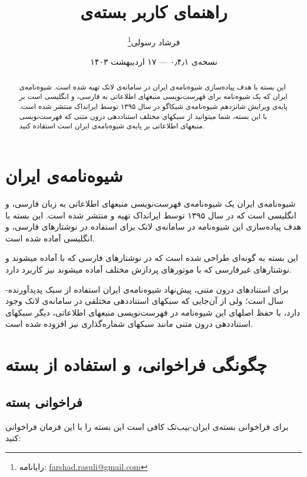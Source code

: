 \documentclass[a4paper,11pt]{article}
\begin{document}
\title{راهنمای کاربر بسته‌ی }
\author{فرشاد رسولی\thanks{رایانامه: \url{farshad.rasuli@gmail.com}}}
\date{نسخه‌ی ۰٫۴٫۱ --- ۱۷ اردیبهشت ۱۴۰۳}
\maketitle


\begin{abstract}
این بسته با هدف پیاده‌سازی شیوه‌نامه‌ی ایران در سامانه‌ی لاتک تهیه شده است. شیوه‌نامه‌ی ایران که یک شیوه‌نامه برای فهرست‌نویسی منبعهای اطلاعاتی به فارسی، و انگلیسی است بر پایه‌ی ویرایش شانزدهم شیوه‌نامه‌ی شیکاگو در سال ۱۳۹۵ توسط ایرانداک منتشر شده است. با این بسته، شما میتوانید از سبکهای مختلف استناددهی درون متنی که فهرست‌نویسی منبعهای اطلاعاتی بر پایه‌ی شیوه‌نامه‌ی ایران است استفاده کنید.
\end{abstract}



\section{شیوه‌نامه‌ی ایران}
شیوه‌نامه‌ی ایران یک شیوه‌نامه‌ی فهرست‌نویسی منبعهای اطلاعاتی به زبان فارسی، و انگلیسی است که در سال ۱۳۹۵ توسط ایرانداک تهیه و منتشر شده است. این بسته با هدف پیاده‌سازی این شیوه‌نامه در سامانه‌ی لاتک برای استفاده در نوشتارهای فارسی، و انگلیسی آماده شده است.


این بسته به گونه‌ای طراحی شده است که در نوشتارهای فارسی که با \XePersian{} آماده میشوند و نوشتارهای غیرفارسی که با موتورهای پردازش مختلف آماده میشوند نیز کاربرد دارد.


برای استنادهای درون متنی، پیش‌نهاد شیوه‌نامه‌ی ایران استفاده از سبک پدیدآورنده-سال است؛ ولی از آن‌جایی که سبکهای استناددهی مختلفی در سامانه‌ی لاتک وجود دارد، با حفظ اصلهای این شیوه‌نامه در فهرست‌نویسی منبعهای اطلاعاتی، دیگر سبکهای استناددهی درون متنی مانند سبکهای شماره‌گذاری نیز افزوده شده است.


\section{چگونگی فراخوانی، و استفاده از بسته}


\subsection{فراخوانی بسته}
برای فراخوانی بسته‌ی ایران-بیب‌تک کافی است این بسته را با این فرمان فراخوانی کنید:\\
\hspace*{\fill}
\end{document}
